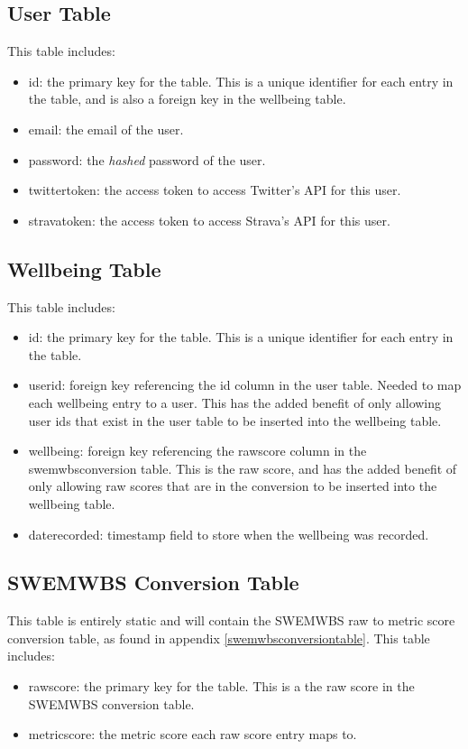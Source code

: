 \documentclass[11pt,openright,a4paper]{report}
\begin{document}
\subsection{User Table}
This table includes:
\begin{itemize}
\item id: the primary key for the table. This is a unique identifier for each entry in the table, and is also a foreign key in the wellbeing table.
\item email: the email of the user.
\item password: the \emph{hashed} password of the user.
\item twitter\textunderscore token: the access token to access Twitter's API for this user.
\item strava\textunderscore token: the access token to access Strava's API for this user.
\end{itemize}

\subsection{Wellbeing Table}
This table includes:
\begin{itemize}
\item id: the primary key for the table. This is a unique identifier for each entry in the table.
\item user\textunderscore id: foreign key referencing the id column in the user table. Needed to map each wellbeing entry to a user. This has the added benefit of only allowing user ids that exist in the user table to be inserted into the wellbeing table.
\item wellbeing: foreign key referencing the raw\textunderscore score column in the swemwbs\textunderscore conversion table. This is the raw score, and has the added benefit of only allowing raw scores that are in the conversion to be inserted into the wellbeing table.
\item date\textunderscore recorded: timestamp field to store when the wellbeing was recorded.
\end{itemize}

\subsection{SWEMWBS Conversion Table}
This table is entirely static and will contain the SWEMWBS raw to metric score conversion table, as found in appendix \ref{swemwbsconversiontable}. This table includes:
\begin{itemize}
\item raw\textunderscore score: the primary key for the table. This is a the raw score in the SWEMWBS conversion table.
\item metric\textunderscore score: the metric score each raw score entry maps to.
\end{itemize}
\end{document}
